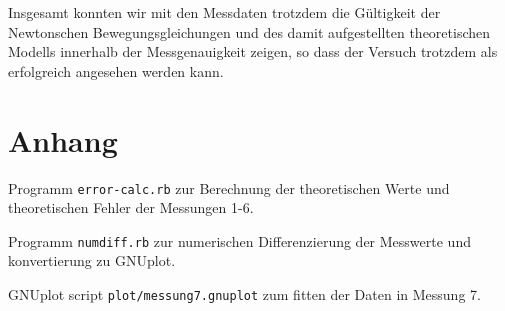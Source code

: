 \documentclass[a4paper,german,12pt,smallheadings]{scrartcl}
\begin{document}
Insgesamt konnten wir mit den Messdaten trotzdem die Gültigkeit der Newtonschen
Bewegungsgleichungen und des damit aufgestellten theoretischen Modells
innerhalb der Messgenauigkeit zeigen, so dass der Versuch trotzdem als
erfolgreich angesehen werden kann.

\newpage
\begin{landscape}
  
\end{landscape}

\newpage
\section*{Anhang}
\lstset{basicstyle=\footnotesize\ttfamily,breaklines=true}
\lstset{numbers=left, frame=single}

Programm \texttt{error-calc.rb} zur Berechnung der theoretischen Werte und
theoretischen Fehler der Messungen 1-6.



Programm \texttt{numdiff.rb} zur numerischen Differenzierung der Messwerte und
konvertierung zu GNUplot.


GNUplot script \texttt{plot/messung7.gnuplot} zum fitten der Daten in Messung 7.

\end{document}
